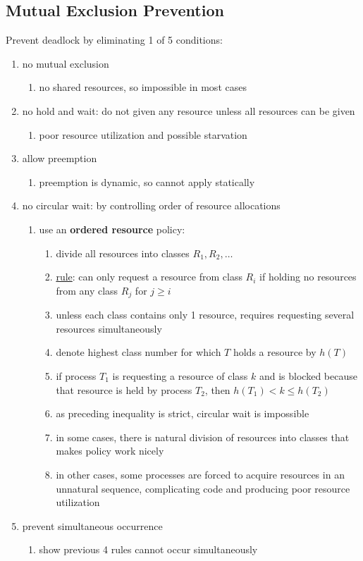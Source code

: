 \documentclass[11pt]{article}
\begin{document}
\subsection{Mutual Exclusion Prevention}
\label{sec:org84d36c6}
Prevent deadlock by eliminating 1 of 5 conditions:
\begin{enumerate}
\item no mutual exclusion
\begin{enumerate}
\item no shared resources, so impossible in most cases
\end{enumerate}
\item no hold and wait: do not given any resource unless all resources can be given
\begin{enumerate}
\item poor resource utilization and possible starvation
\end{enumerate}
\item allow preemption
\begin{enumerate}
\item preemption is dynamic, so cannot apply statically
\end{enumerate}
\item no circular wait: by controlling order of resource allocations
\begin{enumerate}
\item use an \textbf{ordered resource} policy:
\begin{enumerate}
\item divide all resources into classes \(R_{1}, R_{2}, \dots\)
\item \uline{rule}: can only request a resource from class \(R_{i}\) if holding no resources from any
class \(R_{j}\) for \(j \ge i\)
\item unless each class contains only 1 resource, requires requesting several resources
simultaneously
\item denote highest class number for which \(T\) holds a resource by \(h(T)\)
\item if process \(T_{1}\) is requesting a resource of class \(k\) and is blocked because that
resource is held by process \(T_{2}\), then \(h(T_{1}) < k \le h(T_{2})\)
\item as preceding inequality is strict, circular wait is impossible
\item in some cases, there is natural division of resources into classes that makes
policy work nicely
\item in other cases, some processes are forced to acquire resources in an unnatural sequence,
complicating code and producing poor resource utilization
\end{enumerate}
\end{enumerate}
\item prevent simultaneous occurrence
\begin{enumerate}
\item show previous 4 rules cannot occur simultaneously
\end{enumerate}
\end{enumerate}
\end{document}
